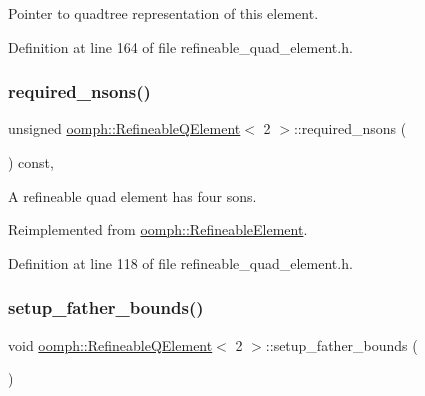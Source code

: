 Pointer to quadtree representation of this element. 



Definition at line 164 of file refineable\+\_\+quad\+\_\+element.\+h.

\mbox{\label{classoomph_1_1RefineableQElement_3_012_01_4_aac8b41efa9e63826756b390da15644bb}} 
\subsubsection{\texorpdfstring{required\+\_\+nsons()}{required\_nsons()}}
{\footnotesize\ttfamily unsigned \hyperlink{classoomph_1_1RefineableQElement}{oomph\+::\+Refineable\+Q\+Element}$<$ 2 $>$\+::required\+\_\+nsons (\begin{DoxyParamCaption}{ }\end{DoxyParamCaption}) const\hspace{0.3cm}{\ttfamily [inline]}, {\ttfamily [virtual]}}



A refineable quad element has four sons. 



Reimplemented from \hyperlink{classoomph_1_1RefineableElement_a9761852271f6cc9a1a0552ad7e054e4b}{oomph\+::\+Refineable\+Element}.



Definition at line 118 of file refineable\+\_\+quad\+\_\+element.\+h.

\mbox{\label{classoomph_1_1RefineableQElement_3_012_01_4_ae72bc768135f78c574710524293bdbe2}} 
\subsubsection{\texorpdfstring{setup\+\_\+father\+\_\+bounds()}{setup\_father\_bounds()}}
{\footnotesize\ttfamily void \hyperlink{classoomph_1_1RefineableQElement}{oomph\+::\+Refineable\+Q\+Element}$<$ 2 $>$\+::setup\+\_\+father\+\_\+bounds (\begin{DoxyParamCaption}{ }\end{DoxyParamCaption})\hspace{0.3cm}{\ttfamily [protected]}}



